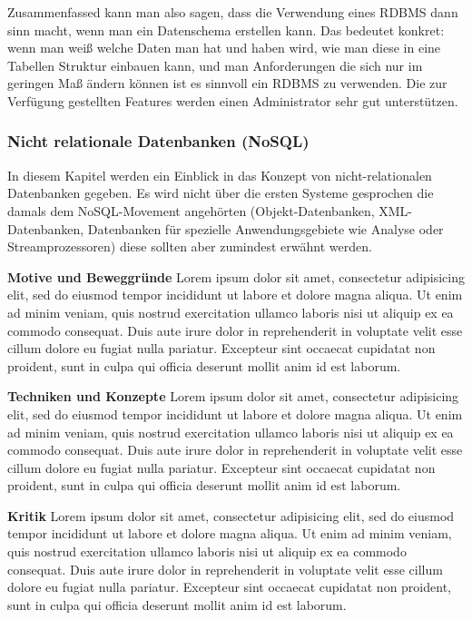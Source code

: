 Zusammenfassed kann man also sagen, dass die Verwendung eines RDBMS dann sinn macht, wenn man ein Datenschema erstellen kann. Das bedeutet konkret: wenn man weiß welche Daten man hat und haben wird, wie man diese in eine Tabellen Struktur einbauen kann, und man Anforderungen die sich nur im geringen Maß ändern können ist es sinnvoll ein RDBMS zu verwenden. Die zur Verfügung gestellten Features werden einen Administrator sehr gut unterstützen. 


\subsubsection{Nicht relationale Datenbanken (NoSQL)}
\label{subsec:nichtrelationaleDB}

In diesem Kapitel werden ein Einblick in das Konzept von nicht-relationalen Datenbanken gegeben. Es wird nicht über die ersten Systeme gesprochen die damals dem NoSQL-Movement angehörten (Objekt-Datenbanken, XML-Datenbanken, Datenbanken für spezielle Anwendungsgebiete wie Analyse oder Streamprozessoren) diese sollten aber zumindest erwähnt werden. \nextline

\textbf{Motive und Beweggründe\newline}
Lorem ipsum dolor sit amet, consectetur adipisicing elit, sed do eiusmod
tempor incididunt ut labore et dolore magna aliqua. Ut enim ad minim veniam,
quis nostrud exercitation ullamco laboris nisi ut aliquip ex ea commodo
consequat. Duis aute irure dolor in reprehenderit in voluptate velit esse
cillum dolore eu fugiat nulla pariatur. Excepteur sint occaecat cupidatat non
proident, sunt in culpa qui officia deserunt mollit anim id est laborum. \nextline

\textbf{Techniken und Konzepte\newline}
Lorem ipsum dolor sit amet, consectetur adipisicing elit, sed do eiusmod
tempor incididunt ut labore et dolore magna aliqua. Ut enim ad minim veniam,
quis nostrud exercitation ullamco laboris nisi ut aliquip ex ea commodo
consequat. Duis aute irure dolor in reprehenderit in voluptate velit esse
cillum dolore eu fugiat nulla pariatur. Excepteur sint occaecat cupidatat non
proident, sunt in culpa qui officia deserunt mollit anim id est laborum. \nextline

\textbf{Kritik\newline}
Lorem ipsum dolor sit amet, consectetur adipisicing elit, sed do eiusmod
tempor incididunt ut labore et dolore magna aliqua. Ut enim ad minim veniam,
quis nostrud exercitation ullamco laboris nisi ut aliquip ex ea commodo
consequat. Duis aute irure dolor in reprehenderit in voluptate velit esse
cillum dolore eu fugiat nulla pariatur. Excepteur sint occaecat cupidatat non
proident, sunt in culpa qui officia deserunt mollit anim id est laborum. \nextline

